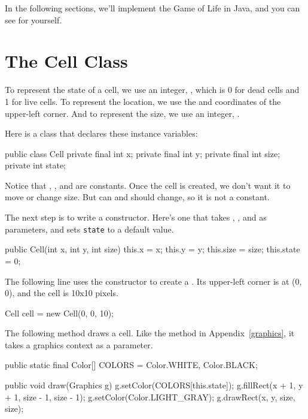 In the following sections, we'll implement the Game of Life in Java, and you can see for yourself.


\section{The Cell Class}


To represent the state of a cell, we use an integer, , which is 0 for dead cells and 1 for live cells.
To represent the location, we use the  and  coordinates of the upper-left corner.
And to represent the size, we use an integer, .

Here is a  class that declares these instance variables:

\begin{code}
public class Cell {
    private final int x;
    private final int y;
    private final int size;
    private int state;
}
\end{code}

Notice that , , and  are constants.
Once the cell is created, we don't want it to move or change size.
But  can and should change, so it is not a constant.

The next step is to write a constructor.
Here's one that takes , , and  as parameters, and sets {\tt state} to a default value.

\begin{code}
public Cell(int x, int y, int size) {
    this.x = x;
    this.y = y;
    this.size = size;
    this.state = 0;
}
\end{code}

The following line uses the constructor to create a .
Its upper-left corner is at (0, 0), and the cell is 10x10 pixels.

\begin{code}
Cell cell = new Cell(0, 0, 10);
\end{code}

The following method draws a cell.
Like the  method in Appendix~\ref{graphics}, it takes a graphics context as a parameter.

\begin{code}
public static final Color[] COLORS = {Color.WHITE, Color.BLACK};

public void draw(Graphics g) {
    g.setColor(COLORS[this.state]);
    g.fillRect(x + 1, y + 1, size - 1, size - 1);
    g.setColor(Color.LIGHT_GRAY);
    g.drawRect(x, y, size, size);
}
\end{code}


